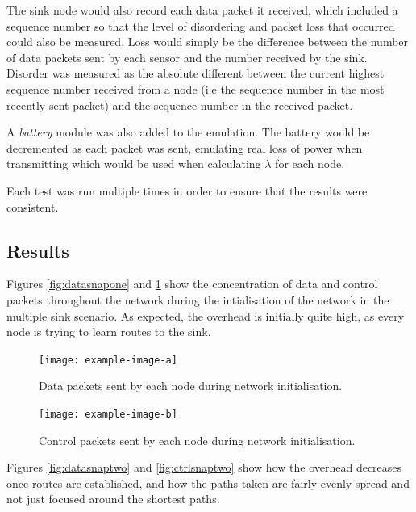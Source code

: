 \documentclass[12pt]{article}
\begin{document}
The sink node would also record each data packet it received, which included a sequence number so that the level of disordering and packet loss that occurred could also be measured. Loss would simply be the difference between the number of data packets sent by each sensor and the number received by the sink. Disorder was measured as the absolute different between the current highest sequence number received from a node (i.e the sequence number in the most recently sent packet) and the sequence number in the received packet.

A \emph{battery} module was also added to the emulation. The battery would be decremented as each packet was sent, emulating real loss of power when transmitting which would be used when calculating $\lambda$ for each node.

Each test was run multiple times in order to ensure that the results were consistent.

\subsection{Results}

Figures \ref{fig:datasnapone} and \ref{fig:ctrlsnapone} show the concentration of data and control packets throughout the network during the intialisation of the network in the multiple sink scenario. As expected, the overhead is initially quite high, as every node is trying to learn routes to the sink. 

\begin{figure}[!ht]
    \centering
    \begin{minipage}{0.45\textwidth}
        \centering
        \texttt{[image: example-image-a]} %
        \caption{Data packets sent by each node during network initialisation.}
        \label{fig:datasnapone}
    \end{minipage}\hfill
    \begin{minipage}{0.45\textwidth}
        \centering
        \texttt{[image: example-image-b]} %
        \caption{Control packets sent by each node during network initialisation.}
        \label{fig:ctrlsnapone}
    \end{minipage}
\end{figure}

Figures \ref{fig:datasnaptwo} and \ref{fig:ctrlsnaptwo} show how the overhead decreases once routes are established, and how the paths taken are fairly evenly spread and not just focused around the shortest paths. 
\end{document}
